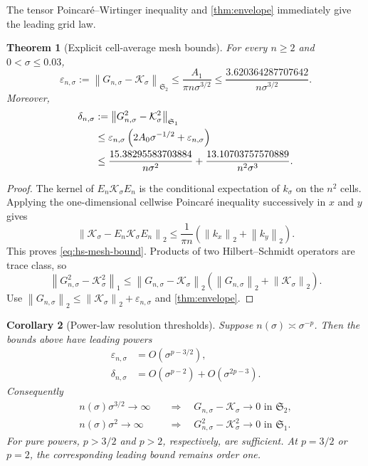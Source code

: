 \documentclass[11pt]{article}
\newtheorem{theorem}{Theorem}[section]
\newtheorem{corollary}[theorem]{Corollary}
\theoremstyle{definition}
\theoremstyle{remark}
\newcommand{\cK}{\mathcal K}
\newcommand{\norm}[1]{\left\lVert #1\right\rVert}
\begin{document}
The tensor Poincar\'e--Wirtinger inequality and
\cref{thm:envelope} immediately give the leading grid law.

\begin{theorem}[Explicit cell-average mesh bounds]
\label{thm:mesh-bounds}
For every $n\ge2$ and $0<\sigma\le0.03$,
\begin{equation}
 \varepsilon_{n,\sigma}
 :=\norm{G_{n,\sigma}-\cK_\sigma}_{\mathfrak S_2}
 \le\frac{A_1}{\pi n\sigma^{3/2}}
 \le\frac{3.620364287707642}{n\sigma^{3/2}}.
 \label{eq:hs-mesh-bound}
\end{equation}
Moreover,
\begin{align}
 \delta_{n,\sigma}
 &:=\norm{G_{n,\sigma}^2-\cK_\sigma^2}_{\mathfrak S_1}
 \notag\\
 &\le\varepsilon_{n,\sigma}
 \left(2A_0\sigma^{-1/2}+\varepsilon_{n,\sigma}\right)
 \label{eq:square-bound-abstract}\\
 &\le
 \frac{15.38295583703884}{n\sigma^2}
 +\frac{13.10703757570889}{n^2\sigma^3}.
 \label{eq:square-mesh-bound}
\end{align}
\end{theorem}

\begin{proof}
The kernel of $E_n\cK_\sigma E_n$ is the conditional expectation of
$k_\sigma$ on the $n^2$ cells.  Applying the one-dimensional cellwise
Poincar\'e inequality successively in $x$ and $y$ gives
\[
 \norm{\cK_\sigma-E_n\cK_\sigma E_n}_2
 \le\frac1{\pi n}
 \left(\norm{k_x}_2+\norm{k_y}_2\right).
\]
This proves \eqref{eq:hs-mesh-bound}.  Products of two Hilbert--Schmidt
operators are trace class, so
\[
 \norm{G_{n,\sigma}^2-\cK_\sigma^2}_1
 \le\norm{G_{n,\sigma}-\cK_\sigma}_2
 \left(\norm{G_{n,\sigma}}_2+\norm{\cK_\sigma}_2\right).
\]
Use
$\norm{G_{n,\sigma}}_2\le
\norm{\cK_\sigma}_2+\varepsilon_{n,\sigma}$ and
\cref{thm:envelope}.
\end{proof}

\begin{corollary}[Power-law resolution thresholds]
\label{cor:power-thresholds}
Suppose $n(\sigma)\asymp\sigma^{-p}$.  Then the bounds above have leading
powers
\begin{align}
 \varepsilon_{n,\sigma}&=O(\sigma^{p-3/2}),
 \label{eq:hs-power}\\
 \delta_{n,\sigma}
 &=O(\sigma^{p-2})+O(\sigma^{2p-3}).
 \label{eq:trace-power}
\end{align}
Consequently
\begin{align}
 n(\sigma)\sigma^{3/2}\to\infty
 &\quad\Longrightarrow\quad
 G_{n,\sigma}-\cK_\sigma\to0
 \text{ in }\mathfrak S_2,
 \label{eq:hs-condition}\\
 n(\sigma)\sigma^2\to\infty
 &\quad\Longrightarrow\quad
 G_{n,\sigma}^2-\cK_\sigma^2\to0
 \text{ in }\mathfrak S_1.
 \label{eq:trace-condition}
\end{align}
For pure powers, $p>3/2$ and $p>2$, respectively, are sufficient.  At
$p=3/2$ or $p=2$, the corresponding leading bound remains order one.
\end{corollary}
\end{document}

